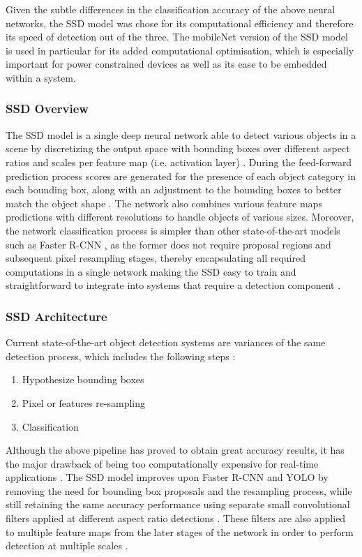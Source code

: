 Given the subtle differences in the classification accuracy of the above neural networks, the SSD model was chose for its computational efficiency and therefore its speed of detection out of the three. The mobileNet version of the SSD model is used in particular for its added computational optimisation, which is especially important for power constrained devices as well as its ease to be embedded within a system.

\subsubsection{SSD Overview}

The SSD model is a single deep neural network able to detect various objects in a scene by discretizing the output space with bounding boxes over different aspect ratios and scales per feature map (i.e. activation layer) \cite{paper:SSD}. During the feed-forward prediction process scores are generated for the presence of each object category in each bounding box, along with an adjustment to the bounding boxes to better match the object shape \cite{paper:SSD}. The network also combines various feature maps predictions with different resolutions to handle objects of various sizes. Moreover, the network classification process is simpler than other state-of-the-art models such as Faster R-CNN \cite{paper:FRCNN}, as the former does not require proposal regions and subsequent pixel resampling stages, thereby encapsulating all required computations in a single network making the SSD easy to train and straightforward to integrate into systems that require a detection component \cite{paper:SSD}.

\subsubsection{SSD Architecture}

Current state-of-the-art object detection systems are variances of the same detection process, which includes the following steps \cite{paper:SSD}:

\begin{enumerate}
  \item Hypothesize bounding boxes
  \item Pixel or features re-sampling
  \item Classification
\end{enumerate}

Although the above pipeline has proved to obtain great accuracy results, it has the major drawback of being too computationally expensive for real-time applications \cite{paper:SSD}. The SSD model improves upon Faster R-CNN \cite{paper:FRCNN} and YOLO \cite{paper:YOLO} by removing the need for bounding box proposals and the resampling process, while still retaining the same accuracy performance using separate small convolutional filters applied at different aspect ratio detections \cite{paper:SSD}. These  filters are also applied to multiple feature maps from the later stages of the network in order to perform detection at multiple scales \cite{paper:SSD}.

